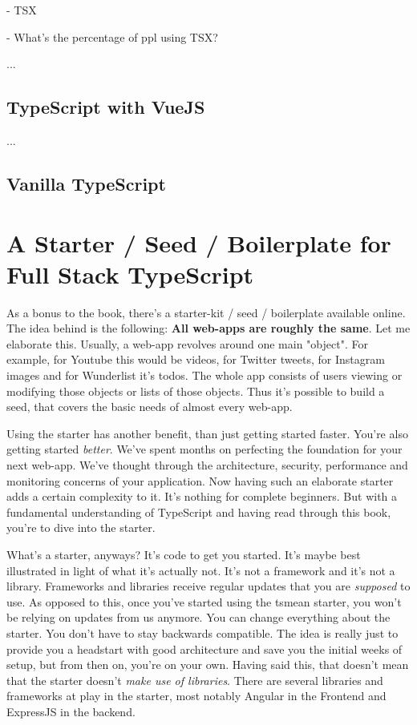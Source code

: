 \documentclass[12pt,a4paper]{report}
\begin{document}
- TSX

- What's the percentage of ppl using TSX?

...


\section{TypeScript with VueJS}

...

\section{Vanilla TypeScript}


\chapter{A Starter / Seed / Boilerplate for Full Stack TypeScript}

As a bonus to the book, there's a starter-kit / seed / boilerplate available online. The idea behind is the following: \textbf{All web-apps are roughly the same}. Let me elaborate this. Usually, a web-app revolves around one main "object". For example, for Youtube this would be videos, for Twitter tweets, for Instagram images and for Wunderlist it's todos. The whole app consists of users viewing or modifying those objects or lists of those objects. Thus it's possible to build a seed, that covers the basic needs of almost every web-app.

Using the starter has another benefit, than just getting started faster. You're also getting started \textit{better}. We've spent months on perfecting the foundation for your next web-app. We've thought through the architecture, security, performance and monitoring concerns of your application. Now having such an elaborate starter adds a certain complexity to it. It's nothing for complete beginners. But with a fundamental understanding of TypeScript and having read through this book, you're to dive into the starter.

What's a starter, anyways? It's code to get you started. It's maybe best illustrated in light of what it's actually not. It's not a framework and it's not a library. Frameworks and libraries receive regular updates that you are \textit{supposed} to use. As opposed to this, once you've started using the tsmean starter, you won't be relying on updates from us anymore. You can change everything about the starter. You don't have to stay backwards compatible. The idea is really just to provide you a headstart with good architecture and save you the initial weeks of setup, but from then on, you're on your own. Having said this, that doesn't mean that the starter doesn't \textit{make use of libraries}. There are several libraries and frameworks at play in the starter, most notably Angular in the Frontend and ExpressJS in the backend.
\end{document}
